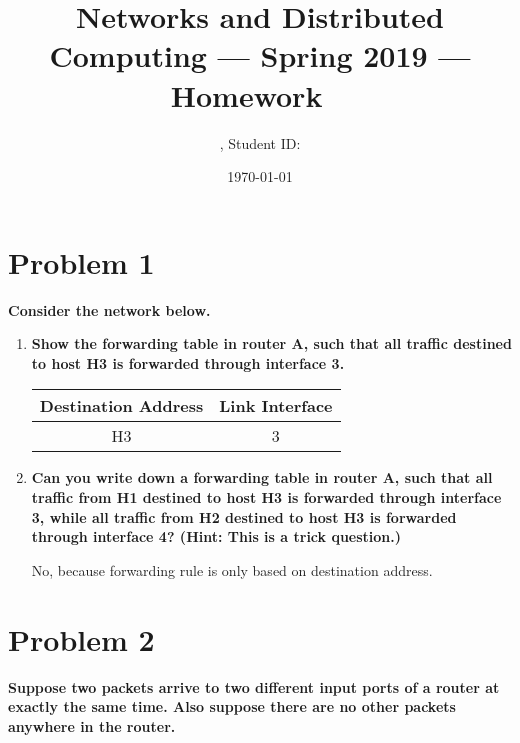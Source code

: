 \documentclass[11pt]{article}
\title{\Large Networks and Distributed Computing --- Spring 2019 --- Homework \Homework\ }
\author{\Name, Student ID: \SID}
\date{\today}
\newenvironment{qparts}{\begin{enumerate}[{(}a{)}]}{\end{enumerate}}
\begin{document}
\maketitle

\section{Problem 1}

\textbf{Consider the network below.}

\begin{qparts}

	\item \textbf{Show the forwarding table in router A, such that all traffic destined to host H3 is forwarded through interface 3.}
	
	\begin{tabular}{c|c}
		Destination Address & Link Interface \\
		\hline
		H3 & 3 \\
	\end{tabular}
	
	\item \textbf{Can you write down a forwarding table in router A, such that all traffic from H1 destined to host H3 is forwarded through interface 3, while all traffic from H2 destined to host H3 is forwarded through interface 4? (Hint: This is a trick question.)}

	No, because forwarding rule is only based on destination address.
	

\end{qparts}


\newpage
\section{Problem 2}

\textbf{Suppose two packets arrive to two different input ports of a router at exactly the same time. Also suppose there are no other packets anywhere in the router.}
\end{document}
